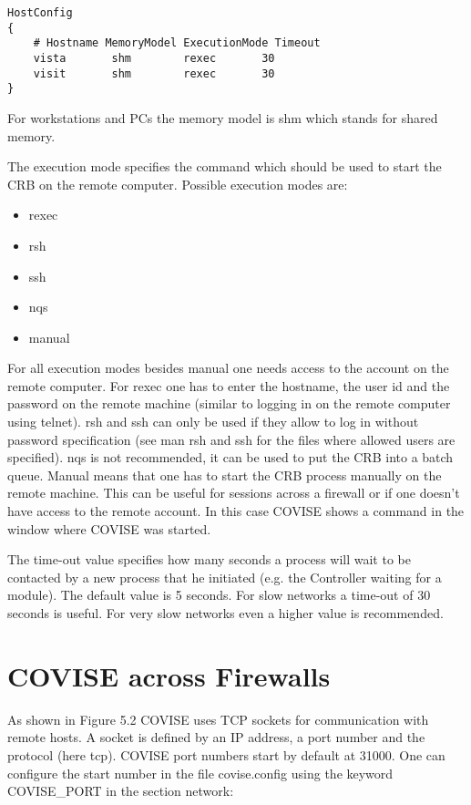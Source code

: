 \begin{verbatim}
HostConfig
{
    # Hostname MemoryModel ExecutionMode Timeout
    vista       shm        rexec       30
    visit       shm        rexec       30
}
\end{verbatim}

For workstations and PCs the memory model is shm which stands for shared memory.

The execution mode specifies the command which should be used to start the CRB on the remote computer. Possible
execution modes are:

\begin{itemize}
\item rexec
\item rsh
\item ssh
\item nqs
\item manual
\end{itemize}

For all execution modes besides manual one needs access to the account on the remote 
computer. For rexec one has to enter the hostname, the user id and the password on the 
remote machine (similar to logging in on the remote computer using telnet). rsh and ssh 
can only be used if they allow to log in without password specification (see man rsh and 
ssh for the files where allowed users are specified). nqs is not recommended, it can be 
used to put the CRB into a batch queue. Manual means that one has to start the CRB 
process manually on the remote machine. This can be useful for sessions across a 
firewall or if one doesn't have access to the remote account. In this case COVISE 
shows a command in the window where COVISE was started.

The time-out value specifies how many seconds a process will wait to be contacted by a 
new process that he initiated (e.g. the Controller waiting for a module). The default 
value is 5 seconds. For slow networks a time-out of 30 seconds is useful. For very 
slow networks even a higher value is recommended.


\section{COVISE across Firewalls}

As shown in Figure 5.2 COVISE uses TCP sockets for communication with remote hosts. 
A socket is defined by an IP address, a port number and the protocol (here tcp). COVISE 
port numbers start by default at 31000. One can configure the start number in the 
file covise.config using the keyword COVISE\_PORT in the section network:
 
